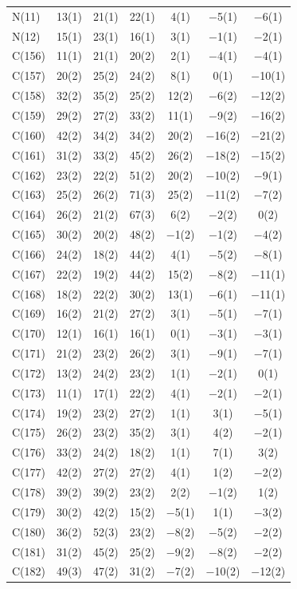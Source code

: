 \begin{center}
{\begin{supertabular}{lcccccc}
N(11)&13(1) &21(1)&22(1) &4(1)&$-$5(1) &$-$6(1)\\
N(12)&15(1) &23(1)&16(1) &3(1)&$-$1(1) &$-$2(1)\\
C(156)&11(1) &21(1)&20(2) &2(1)&$-$4(1) &$-$4(1)\\
C(157)&20(2) &25(2)&24(2) &8(1)&0(1) &$-$10(1)\\
C(158)&32(2) &35(2)&25(2) &12(2)&$-$6(2) &$-$12(2)\\
C(159)&29(2) &27(2)&33(2) &11(1)&$-$9(2) &$-$16(2)\\
C(160)&42(2) &34(2)&34(2) &20(2)&$-$16(2) &$-$21(2)\\
C(161)&31(2) &33(2)&45(2) &26(2)&$-$18(2) &$-$15(2)\\
C(162)&23(2) &22(2)&51(2) &20(2)&$-$10(2) &$-$9(1)\\
C(163)&25(2) &26(2)&71(3) &25(2)&$-$11(2) &$-$7(2)\\
C(164)&26(2) &21(2)&67(3) &6(2)&$-$2(2) &0(2)\\
C(165)&30(2) &20(2)&48(2) &$-$1(2)&$-$1(2) &$-$4(2)\\
C(166)&24(2) &18(2)&44(2) &4(1)&$-$5(2) &$-$8(1)\\
C(167)&22(2) &19(2)&44(2) &15(2)&$-$8(2) &$-$11(1)\\
C(168)&18(2) &22(2)&30(2) &13(1)&$-$6(1) &$-$11(1)\\
C(169)&16(2) &21(2)&27(2) &3(1)&$-$5(1) &$-$7(1)\\
C(170)&12(1) &16(1)&16(1) &0(1)&$-$3(1) &$-$3(1)\\
C(171)&21(2) &23(2)&26(2) &3(1)&$-$9(1) &$-$7(1)\\
C(172)&13(2) &24(2)&23(2) &1(1)&$-$2(1) &0(1)\\
C(173)&11(1) &17(1)&22(2) &4(1)&$-$2(1) &$-$2(1)\\
C(174)&19(2) &23(2)&27(2) &1(1)&3(1) &$-$5(1)\\
C(175)&26(2) &23(2)&35(2) &3(1)&4(2) &$-$2(1)\\
C(176)&33(2) &24(2)&18(2) &1(1)&7(1) &3(2)\\
C(177)&42(2) &27(2)&27(2) &4(1)&1(2) &$-$2(2)\\
C(178)&39(2) &39(2)&23(2) &2(2)&$-$1(2) &1(2)\\
C(179)&30(2) &42(2)&15(2) &$-$5(1)&1(1) &$-$3(2)\\
C(180)&36(2) &52(3)&23(2) &$-$8(2)&$-$5(2) &$-$2(2)\\
C(181)&31(2) &45(2)&25(2) &$-$9(2)&$-$8(2) &$-$2(2)\\
C(182)&49(3) &47(2)&31(2) &$-$7(2)&$-$10(2) &$-$12(2)\\

\end{supertabular}}
\end{center}

